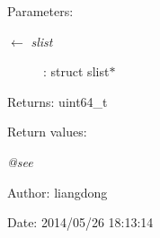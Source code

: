 \begin{Desc}
\item[Parameters:]
\begin{description}
\item[\mbox{$\leftarrow$} {\em slist}]: struct slist$\ast$ \end{description}
\end{Desc}
\begin{Desc}
\item[Returns:]uint64\_\-t \end{Desc}
\begin{Desc}
\item[Return values:]
\begin{description}
\item[{\em @see}]\end{description}
\end{Desc}
\begin{Desc}
\item[Author:]liangdong \end{Desc}
\begin{Desc}
\item[Date:]2014/05/26 18:13:14 \end{Desc}
